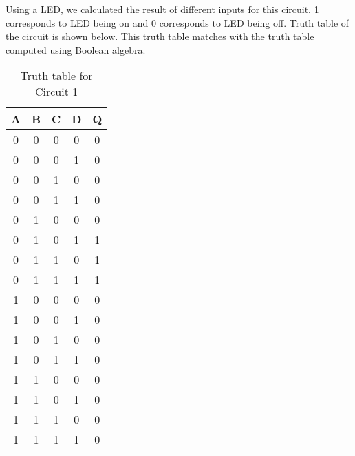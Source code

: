 \documentclass[12pt]{article}
\begin{document}
Using a LED, we calculated the result of different inputs for this circuit. 1 corresponds to LED being on and 0 corresponds to LED being off. Truth table of the circuit is shown below.  This truth table matches with the truth table computed using Boolean algebra.
\begin{table}[H]
\begin{center}
\begin{tabular}{|c|c|c|c|c|}
	\hline
	\rule[-1ex]{0pt}{2.5ex} \textbf{A} & \textbf{B} & \textbf{C} & \textbf{D} & \textbf{Q} \\
	\hline \hline
	\rule[-1ex]{0pt}{2.5ex} 0 & 0 & 0 & 0 & 0 \\
	\hline
	\rule[-1ex]{0pt}{2.5ex} 0 & 0 & 0 & 1 & 0 \\
	\hline
	\rule[-1ex]{0pt}{2.5ex} 0 & 0 & 1 & 0 & 0 \\
	\hline
	\rule[-1ex]{0pt}{2.5ex} 0 & 0 & 1 & 1 & 0 \\
	\hline
	\rule[-1ex]{0pt}{2.5ex} 0 & 1 & 0 & 0 & 0 \\
	\hline
	\rule[-1ex]{0pt}{2.5ex} 0 & 1 & 0 & 1 & 1 \\
	\hline
	\rule[-1ex]{0pt}{2.5ex} 0 & 1 & 1 & 0 & 1 \\
	\hline
	\rule[-1ex]{0pt}{2.5ex} 0 & 1 & 1 & 1 & 1 \\
	\hline
	\rule[-1ex]{0pt}{2.5ex} 1 & 0 & 0 & 0 & 0 \\
	\hline
	\rule[-1ex]{0pt}{2.5ex} 1 & 0 & 0 & 1 & 0 \\
	\hline
	\rule[-1ex]{0pt}{2.5ex} 1 & 0 & 1 & 0 & 0 \\
	\hline
	\rule[-1ex]{0pt}{2.5ex} 1 & 0 & 1 & 1 & 0 \\
	\hline
	\rule[-1ex]{0pt}{2.5ex} 1 & 1 & 0 & 0 & 0 \\
	\hline
	\rule[-1ex]{0pt}{2.5ex} 1 & 1 & 0 & 1 & 0 \\
	\hline
	\rule[-1ex]{0pt}{2.5ex} 1 & 1 & 1 & 0 & 0 \\
	\hline
	\rule[-1ex]{0pt}{2.5ex} 1 & 1 & 1 & 1 & 0 \\
	\hline	
\end{tabular}
\caption{Truth table for Circuit 1}
\end{center}
\end{table}
\end{document}
